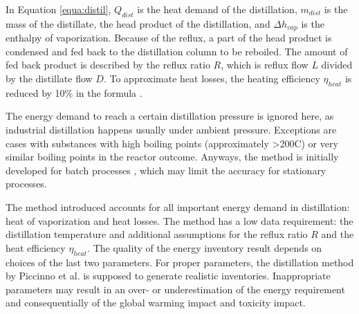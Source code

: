 In Equation \ref{equa:distil}, $Q_{dist}$ is the heat demand of the distillation,  %
$m_{dist}$ is the mass of the distillate, the head product of the distillation, %
and $\Delta h_{vap}$ is the enthalpy of vaporization. %
Because of the reflux, a part of the head product is condensed and fed back to the distillation column to be reboiled. The amount of fed back product is described by the reflux ratio $R$, which is reflux flow $L$ divided by the distillate flow $D$. To approximate heat losses, the heating efficiency $\eta_{heat}$ is reduced by 10\% in the formula \cite{Piccinno.2016}.%
 
The energy demand to reach a certain distillation pressure is ignored here, as industrial distillation happens usually under ambient pressure. Exceptions are cases with substances with high boiling points (approximately >200\degree C) or very similar boiling points in the reactor outcome. Anyways, the method is initially developed for batch processes  \cite{Piccinno.2016}, which may limit the accuracy for stationary processes.

The method introduced accounts for all important energy demand in distillation: heat of vaporization and heat losses. The method has a low data requirement: the distillation temperature and additional assumptions for the reflux ratio $R$ and the heat efficiency $\eta_{heat}$. The quality of the energy inventory result depends on choices of the last two parameters. For proper parameters, the distillation method by Piccinno et al. is supposed to generate realistic inventories. Inappropriate parameters may result in an over- or underestimation of the energy requirement and consequentially of the global warming impact and toxicity impact.

